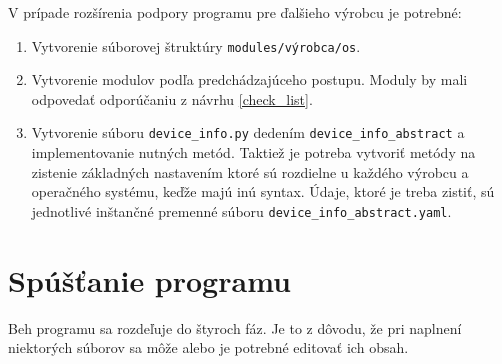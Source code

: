 \vspace{1em}
\noindent
V prípade rozšírenia podpory programu pre ďalšieho výrobcu je potrebné:
\begin{enumerate}
	\item Vytvorenie súborovej štruktúry \texttt{modules/výrobca/os}.
	\item Vytvorenie modulov podľa predchádzajúceho postupu. Moduly by mali odpovedať odporúčaniu z návrhu \ref{check_list}.
	\item Vytvorenie súboru \texttt{device\_info.py} dedením \texttt{device\_info\_abstract} a implementovanie nutných metód. Taktiež je potreba vytvoriť metódy na zistenie základných nastavením ktoré sú rozdielne u každého výrobcu a operačného systému, keďže majú inú syntax. Údaje, ktoré je treba zistiť, sú jednotlivé inštančné premenné súboru \texttt{device\_info\_abstract.yaml}.  
\end{enumerate}

\section{Spúšťanie programu}
Beh programu sa rozdeľuje do štyroch fáz. Je to z dôvodu, že pri naplnení niektorých súborov sa môže alebo je potrebné editovať ich obsah.


